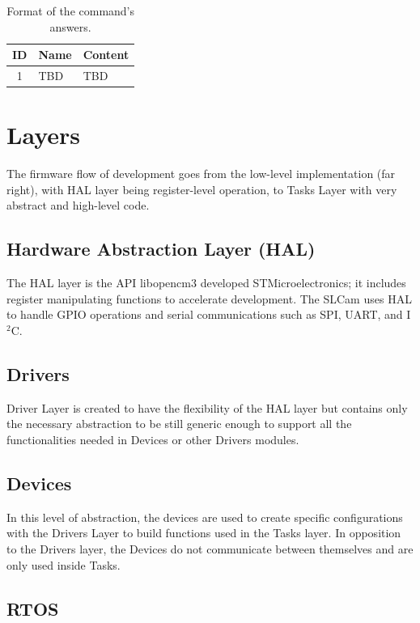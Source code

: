 \begin{table}[!ht]
    \centering
    \begin{tabular}{cll}
        \toprule[1.5pt]
        \textbf{ID} & \textbf{Name} & \textbf{Content}\\
        \midrule
        1   & TBD    & TBD \\
        \bottomrule[1.5pt]
    \end{tabular}
    \caption{Format of the command's answers.}
    \label{tab:commands-ans}
\end{table}

\section{Layers}

The firmware flow of development goes from the low-level implementation (far right), with HAL layer being register-level operation, to Tasks Layer with very abstract and high-level code.

\subsection{Hardware Abstraction Layer (HAL)}

The HAL layer is the API libopencm3 developed STMicroelectronics; it includes register manipulating functions to accelerate development. The SLCam uses HAL to handle GPIO operations and serial communications such as SPI, UART, and I$^2$C.

\subsection{Drivers}

Driver Layer is created to have the flexibility of the HAL layer but contains only the necessary abstraction to be still generic enough to support all the functionalities needed in Devices or other Drivers modules.

\subsection{Devices}

In this level of abstraction, the devices are used to create specific configurations with the Drivers Layer to build functions used in the Tasks layer. In opposition to the Drivers layer, the Devices do not communicate between themselves and are only used inside Tasks.

\subsection{RTOS}

